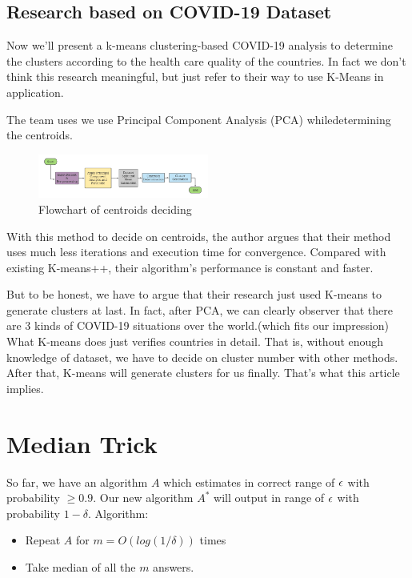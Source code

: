 \documentclass[11pt]{article}
\def\eps{\ensuremath\epsilon}
\begin{document}
\subsection{Research based on COVID-19 Dataset}
Now we'll present a k-means clustering-based COVID-19 analysis to determine the clusters according to the health care quality of the countries. In fact we don't think this research meaningful, but just refer to their way to use K-Means in application.\cite{zubair2020efficient} \par
The team uses we use Principal Component Analysis (PCA)  whiledetermining the centroids.
\begin{figure}[H] %
  \centering %
  \includegraphics[width=0.5\textwidth]{COVID19.png} %
  \caption{Flowchart of centroids deciding} %
  \label{Fig.centroids} %
\end{figure}
With this method to decide on centroids, the author argues that their method uses much less iterations and execution time for convergence. Compared with existing K-means++, their algorithm's performance is constant and faster. \par
But to be honest, we have to argue that their research just used K-means to generate clusters at last. In fact, after PCA, we can clearly observer that there are 3 kinds of COVID-19 situations over the world.(which fits our impression) What K-means does just verifies countries in detail. That is, without enough knowledge of dataset, we have to decide on cluster number with other methods. After that, K-means will generate clusters for us finally. That's what this article implies.


\section{Median Trick}
So far, we have an algorithm $A$ which estimates in correct range of $\eps$ with probability $\ge 0.9$. Our new algorithm $A^{\ast}$ will output in range of $\eps$ with probability $1-\delta$.
Algorithm:
\begin{itemize}
\item Repeat $A$ for $m=O(log (1/\delta))$ times
\item Take median of all the $m$ answers.
\end{itemize}
\end{document}

